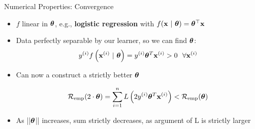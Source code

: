 \documentclass[11pt,compress,t,notes=noshow, xcolor=table]{beamer}
\begin{document}
\begin{vbframe}{Numerical Properties: Convergence}
\begin{itemize}
  \item $f$ linear in $\bm{\theta}$, e.g.,
  \textbf{logistic regression} with $f(\mathbf{x} ~|~ \bm{\theta}) = \bm{\theta}^\top \mathbf{x}$
  \item Data perfectly separable by our learner, so we can find $\bm{\theta}$:
   $$ y^{(i)} f\left(\mathbf{x}^{(i)} ~|~ \bm{\theta}\right) = y^{(i)} \bm{\theta}^T \mathbf{x}^{(i)} > 0 ~~ \forall \mathbf{x}^{(i)}$$




   
  
\item Can now a construct a strictly better $\bm{\theta}$

$$    \mathcal{R}_{\text{emp}}(2 \cdot \bm{\theta}) = \sum\limits_{i=1}^n  
    L \left( 2 y^{(i)} \bm{\theta}^T \mathbf{x}^{(i)}  
    \right) < \mathcal{R}_{\text{emp}}(\bm{\theta})
$$

\item As ||$\bm{\theta}$|| increases, sum strictly decreases, as argument of L is strictly larger


\end{itemize}
\end{vbframe}
\end{document}
